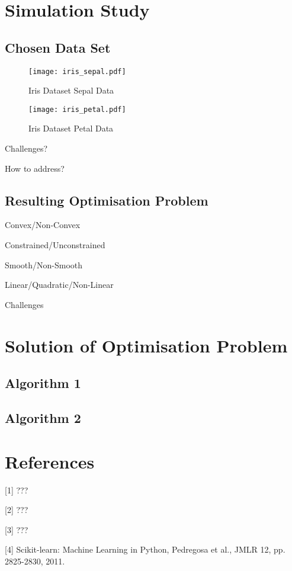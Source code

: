 \documentclass[10pt, a4paper]{amsart}
\begin{document}
\section{Simulation Study}

\subsection{Chosen Data Set}\hfill

\begin{figure}
	\centering	
	\texttt{[image: iris\_sepal.pdf]}
	\caption{Iris Dataset Sepal Data}
\end{figure}

\begin{figure}
	\centering	
	\texttt{[image: iris\_petal.pdf]}
	\caption{Iris Dataset Petal Data}
\end{figure}

Challenges?

How to address?

\subsection{Resulting Optimisation Problem}\hfill

Convex/Non-Convex

Constrained/Unconstrained

Smooth/Non-Smooth

Linear/Quadratic/Non-Linear

Challenges


\section{Solution of Optimisation Problem}

\subsection{Algorithm 1}\hfill

\subsection{Algorithm 2}\hfill


\section{References}

[1] ???

[2] ???

[3] ???

[4] Scikit-learn: Machine Learning in Python, Pedregosa et al., JMLR 12, pp. 2825-2830, 2011.
\end{document}
